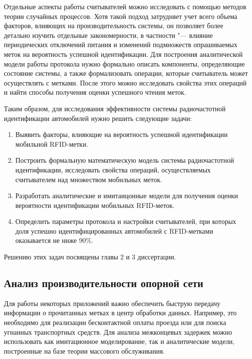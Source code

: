 Отдельные аспекты работы считывателей можно исследовать с помощью методов теории случайных процессов. Хотя такой подход затрудняет учет всего объема факторов, влияющих на производительность системы, он позволяет более детально изучить отдельные закономерности, в частности "--- влияние периодических отключений питания и изменений подмножеств опрашиваемых меток на вероятность успешной идентификации. Для построения аналитической модели работы протокола нужно формально описать компоненты, определяющие состояние системы, а также формализовать операции, которые считыватель может осуществлять с метками. После этого можно исследовать свойства этих операций и найти способы получения оценки успешного чтения меток.

Таким образом, для исследования эффективности системы радиочастотной идентификации автомобилей нужно решить следующие задачи:

\begin{enumerate}
    \item Выявить факторы, влияющие на вероятность успешной идентификации мобильной RFID-метки.
    \item Построить формальную математическую модель системы радиочастотной идентификации, исследовать свойства операций, осуществляемых считывателем над множеством мобильных меток.
    \item Разработать аналитические и имитаицонные модели для получения оценки вероятности идентификации мобильных RFID-меток.
    \item Определить параметры протокола и настройки считывателей, при которых доля успешно идентифицированных автомобилей с RFID-метками оказывается не ниже 90\%.
\end{enumerate}

Решению этих задач посвящены главы 2 и 3 диссертации.



\subsection{Анализ производительности опорной сети}

Для работы некоторых приложений важно обеспечить быструю передачу информации о прочитанных метках в центр обработки данных. Например, это необходимо для реализации бесконтактной оплаты проезда или для поиска угнанных транспортных средств. Для анализа межконцевых задержек можно использовать как имитационное моделирование, так и аналитические модели, построенные на базе теории массового обслуживания.

